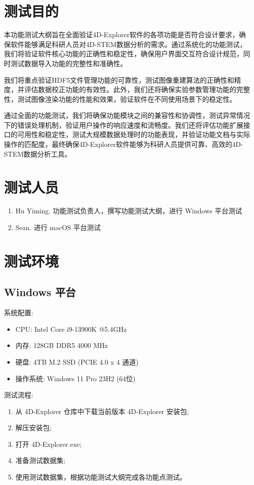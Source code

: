 \documentclass[a4paper,12pt]{report}	%
\begin{document}
\section{测试目的}
本功能测试大纲旨在全面验证4D-Explorer软件的各项功能是否符合设计要求，确保软件能够满足科研人员对4D-STEM数据分析的需求。通过系统化的功能测试，我们将验证软件核心功能的正确性和稳定性，确保用户界面交互符合设计规范，同时测试数据导入功能的完整性和准确性。

我们将重点验证HDF5文件管理功能的可靠性，测试图像重建算法的正确性和精度，并评估数据校正功能的有效性。此外，我们还将确保实验参数管理功能的完整性，测试图像渲染功能的性能和效果，验证软件在不同使用场景下的稳定性。

通过全面的功能测试，我们将确保功能模块之间的兼容性和协调性，测试异常情况下的错误处理机制，验证用户操作的响应速度和流畅度。我们还将评估功能扩展接口的可用性和稳定性，测试大规模数据处理时的功能表现，并验证功能文档与实际操作的匹配度，最终确保4D-Explorer软件能够为科研人员提供可靠、高效的4D-STEM数据分析工具。

\section{测试人员}
\begin{enumerate}
    \item Hu Yiming. 功能测试负责人，撰写功能测试大纲，进行 Windows 平台测试
    \item Sean. 进行 macOS 平台测试
\end{enumerate}

\section{测试环境}

\subsection{Windows 平台}

系统配置:
\begin{itemize}
    \item CPU: Intel Core i9-13900K @5.4GHz 
    \item 内存: 128GB DDR5 4000 MHz 
    \item 硬盘: 4TB M.2 SSD (PCIE 4.0 x 4 通道)
    \item 操作系统: Windows 11 Pro 23H2 (64位)
\end{itemize}

测试流程:
\begin{enumerate}
    \item 从 4D-Explorer 仓库中下载当前版本 4D-Explorer 安装包;
    \item 解压安装包;
    \item 打开 4D-Explorer.exe;
    \item 准备测试数据集;
    \item 使用测试数据集，根据功能测试大纲完成各功能点测试。
\end{enumerate}
\end{document}
